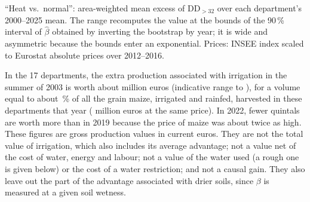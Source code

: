 \begin{table}[H]
\centering
\small
\caption{Production associated with irrigation in hot summers (17 departments, descriptive)}
\label{tab:valuation}
\begin{threeparttable}
{\setlength{\tabcolsep}{4pt}}
\begin{tablenotes}\footnotesize
\item ``Heat vs.\ normal'': area-weighted mean excess of $\mathrm{DD}_{>32}$ over each department's 2000--2025 mean. The range recomputes the value at the bounds of the 90\,\% interval of $\hat\beta$ obtained by inverting the bootstrap by year; it is wide and asymmetric because the bounds enter an exponential. Prices: INSEE index scaled to Eurostat absolute prices over 2012--2016.
\end{tablenotes}
\end{threeparttable}
\end{table}

In the 17 departments, the extra production associated with irrigation in the summer of 2003 is worth about \QoneValTwoThousandThree{} million euros (indicative range \QoneValLow{} to \QoneValHigh), for a volume equal to about \ValShareTwoThousandThree\,\% of all the grain maize, irrigated and rainfed, harvested in these departments that year (\ProdValTwoThousandThree{} million euros at the same price). In 2022, fewer quintals are worth more than in 2019 because the price of maize was about twice as high. These figures are gross production values in current euros. They are not the total value of irrigation, which also includes its average advantage; not a value net of the cost of water, energy and labour; not a value of the water used (a rough one is given below) or the cost of a water restriction; and not a causal gain. They also leave out the part of the advantage associated with drier soils, since $\beta$ is measured at a given soil wetness.

